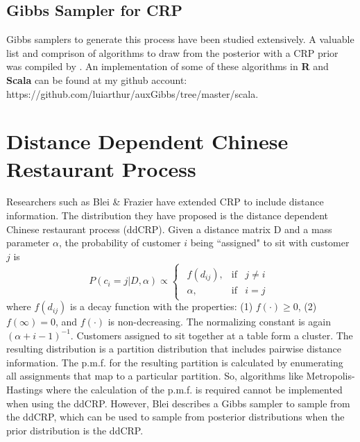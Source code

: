 \subsection{Gibbs Sampler for CRP}
Gibbs samplers to generate this process have been studied extensively.  A
valuable list and comprison of algorithms to draw from the posterior with a CRP
prior was compiled by \cite{neal}. An implementation of some of these
algorithms in \textbf{R} and \textbf{Scala} can be found at my github account:
https://github.com/luiarthur/auxGibbs/tree/master/scala.\\



\section{Distance Dependent Chinese Restaurant Process}
Researchers such as Blei \& Frazier have extended CRP to include distance
information. The distribution they have proposed is the distance dependent
Chinese restaurant process (ddCRP). Given a distance matrix D and a mass
parameter $\alpha$, the probability of customer $i$ being ``assigned" to sit
with customer $j$ is 
\begin{equation}
  P(c_i=j|D,\alpha) \propto 
  \begin{cases}
    \begin{array}{rll}
      f(d_{ij}), & \text{if} & j \ne i\\
      \alpha,    & \text{if} & i=j
    \end{array}  
  \end{cases}
\end{equation}
where $f(d_{ij})$ is a decay function with the properties: (1) $f(\cdot) \ge
0$, (2) $f(\infty) = 0$, and $f(\cdot)$ is non-decreasing. The normalizing
constant is again $(\alpha+i-1)^{-1}$. Customers assigned to sit together at a
table form a cluster. The resulting distribution is a partition distribution
that includes pairwise distance information. The p.m.f. for the resulting
partition is calculated by enumerating all assignments that map to a particular
partition. So, algorithms like Metropolis-Hastings where the calculation of the
p.m.f. is required cannot be implemented when using the ddCRP. However, Blei
describes a Gibbs sampler to sample from the ddCRP, which can be used to sample
from posterior distributions when the prior distribution is the ddCRP.

